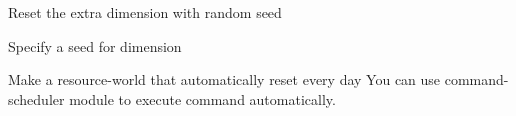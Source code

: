 \begin{example}{Reset the extra dimension with random seed}
\end{example}

\begin{tips}{Specify a seed for dimension}
\end{tips}

\begin{tips}{Make a resource-world that automatically reset every day}
    You can use command-scheduler module to execute  command automatically.
\end{tips}